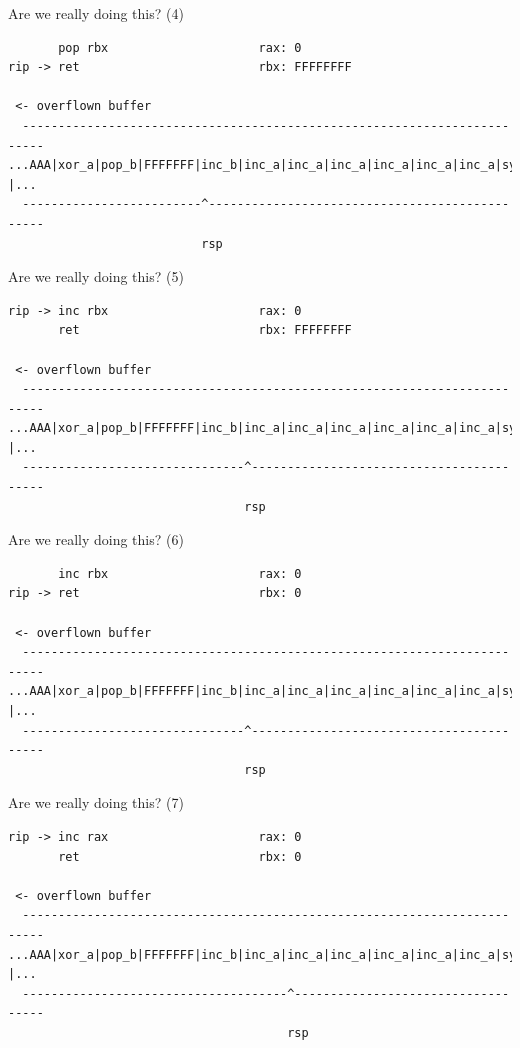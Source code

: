 \documentclass[9pt,aspectratio=169]{beamer}
\begin{document}
\begin{frame}[label={sec:org00fe120},fragile]{Are we really doing this? (4)}
 \begin{verbatim}
       pop rbx                     rax: 0
rip -> ret                         rbx: FFFFFFFF

 <- overflown buffer 
  -------------------------------------------------------------------------
...AAA|xor_a|pop_b|FFFFFFF|inc_b|inc_a|inc_a|inc_a|inc_a|inc_a|inc_a|sys |...
  -------------------------^-----------------------------------------------
                           rsp
\end{verbatim}
\end{frame}
\begin{frame}[label={sec:orgcc68740},fragile]{Are we really doing this? (5)}
 \begin{verbatim}
rip -> inc rbx                     rax: 0
       ret                         rbx: FFFFFFFF

 <- overflown buffer 
  -------------------------------------------------------------------------
...AAA|xor_a|pop_b|FFFFFFF|inc_b|inc_a|inc_a|inc_a|inc_a|inc_a|inc_a|sys |...
  -------------------------------^-----------------------------------------
                                 rsp
\end{verbatim}
\end{frame}
\begin{frame}[label={sec:org4b22247},fragile]{Are we really doing this? (6)}
 \begin{verbatim}
       inc rbx                     rax: 0
rip -> ret                         rbx: 0

 <- overflown buffer 
  -------------------------------------------------------------------------
...AAA|xor_a|pop_b|FFFFFFF|inc_b|inc_a|inc_a|inc_a|inc_a|inc_a|inc_a|sys |...
  -------------------------------^-----------------------------------------
                                 rsp
\end{verbatim}
\end{frame}
\begin{frame}[label={sec:orgeea5e16},fragile]{Are we really doing this? (7)}
 \begin{verbatim}
rip -> inc rax                     rax: 0
       ret                         rbx: 0

 <- overflown buffer 
  -------------------------------------------------------------------------
...AAA|xor_a|pop_b|FFFFFFF|inc_b|inc_a|inc_a|inc_a|inc_a|inc_a|inc_a|sys |...
  -------------------------------------^-----------------------------------
                                       rsp
\end{verbatim}
\end{frame}
\end{document}
